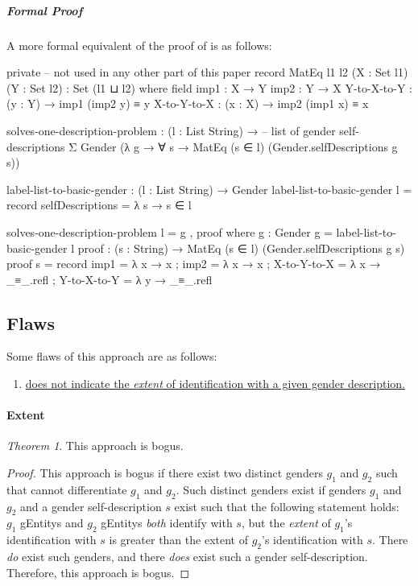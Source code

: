 \documentclass{article}
\theoremstyle{remark}
\newtheorem{theorem}{Theorem}
\newcommand{\summaryLink}[2]{\hyperref[#1]{#2}}
\begin{document}
\subparagraph{Formal Proof}\label{sec:gender7solutionOneProofFormal}
A more formal equivalent of the proof of  is as follows:

\begin{code}
  private -- not used in any other part of this paper
    record MatEq {l1 l2} (X : Set l1) (Y : Set l2) : Set (l1 ⊔ l2) where
      field
        imp1 : X → Y
        imp2 : Y → X
        Y-to-X-to-Y : (y : Y) → imp1 (imp2 y) ≡ y
        X-to-Y-to-X : (x : X) → imp2 (imp1 x) ≡ x

    solves-one-description-problem :
      (l : List String) → -- list of gender self-descriptions
      Σ Gender
        (λ g → ∀ s → MatEq (s ∈ l) (Gender.selfDescriptions g s))

    label-list-to-basic-gender : (l : List String) → Gender
    label-list-to-basic-gender l = record
      { selfDescriptions = λ s → s ∈ l
      }

    solves-one-description-problem l = g , proof
      where
      g : Gender
      g = label-list-to-basic-gender l
      proof : (s : String) → MatEq (s ∈ l) (Gender.selfDescriptions g s)
      proof s = record
        { imp1 = λ x → x
        ; imp2 = λ x → x
        ; X-to-Y-to-X = λ x → _≡_.refl
        ; Y-to-X-to-Y = λ y → _≡_.refl
        }
\end{code}

\subsection{Flaws}\label{sec:gender7flaws}
Some flaws of this approach are as follows:

\begin{enumerate}
  \item \summaryLink{sec:gender7flawExtent}{ does not indicate the \emph{extent} of identification with a given gender description.}\label{enum:gender7flawExtent}
\end{enumerate}

\paragraph{Extent}\label{sec:gender7flawExtent}
\begin{theorem}
  This approach is bogus.
\end{theorem}

\begin{proof}
  This approach is bogus if there exist two distinct genders \(g_1\) and \(g_2\) such that  cannot differentiate \(g_1\) and \(g_2\).  Such distinct genders exist if genders \(g_1\) and \(g_2\) and a gender self-description \(s\) exist such that the following statement holds: \(g_1\) \glspl{gEntity} and \(g_2\) \glspl{gEntity} \emph{both} identify with \(s\), but the \emph{extent} of \(g_1\)'s identification with \(s\) is greater than the extent of \(g_2\)'s identification with \(s\).  There \emph{do} exist such genders, and there \emph{does} exist such a gender self-description.  Therefore, this approach is bogus.
\end{proof}
\end{document}
